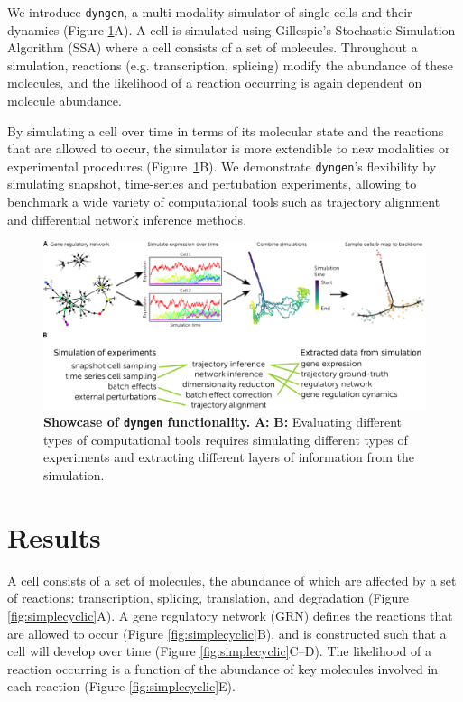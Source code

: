 We introduce \texttt{dyngen}, a multi-modality simulator of single cells and their dynamics (Figure \ref{fig:showcase}A). A cell is simulated using Gillespie's Stochastic Simulation Algorithm (SSA) \cite{gillespie_exactstochasticsimulation_1977} where a cell consists of a set of molecules. Throughout a simulation, reactions (e.g. transcription, splicing) modify the abundance of these molecules, and the likelihood of a reaction occurring is again dependent on molecule abundance.

By simulating a cell over time in terms of its molecular state and the reactions that are allowed to occur, the simulator is more extendible to new modalities or experimental procedures (Figure~\ref{fig:showcase}B). We demonstrate \texttt{dyngen}'s flexibility by simulating snapshot, time-series and pertubation experiments, allowing to benchmark a wide variety of computational tools such as trajectory alignment and differential network inference methods.

\begin{figure}[htb!]
	\centering
	\includegraphics[width=\linewidth]{fig/showcase_4} 
	\caption{
		\textbf{Showcase of \texttt{dyngen} functionality.} 
		\textbf{A:} 
		\textbf{B:} Evaluating different types of computational tools requires simulating different types of experiments and extracting different layers of information from the simulation.
	}
	\label{fig:showcase}
\end{figure}

\section{Results}

A cell consists of a set of molecules, the abundance of which are affected by a set of reactions: transcription, splicing, translation, and degradation (Figure \ref{fig:simplecyclic}A). 
A gene regulatory network (GRN) defines the reactions that are allowed to occur (Figure \ref{fig:simplecyclic}B), and is constructed such that a cell will develop over time (Figure \ref{fig:simplecyclic}C--D).
The likelihood of a reaction occurring is a function of the abundance of key molecules involved in each reaction (Figure \ref{fig:simplecyclic}E).

